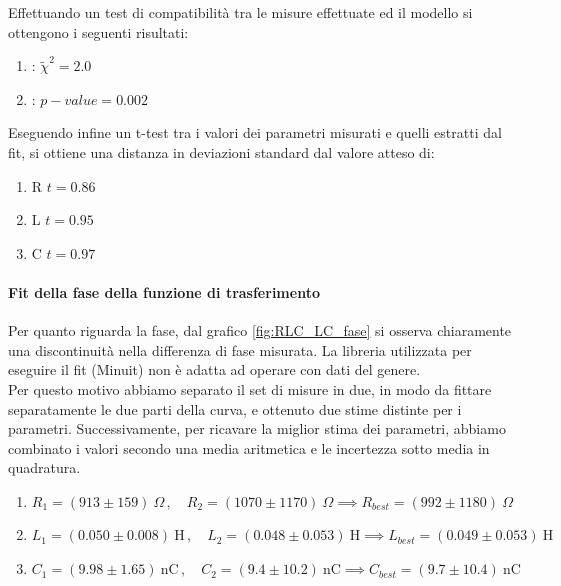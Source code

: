\documentclass[letterpaper,12pt]{article}
\begin{document}
Effettuando un test di compatibilità tra le misure effettuate ed il modello si ottengono i seguenti risultati:

\begin{enumerate} 
    \item: $\widetilde{\chi}^2 = 2.0$   
    \item: $p-value = 0.002$ 
\end{enumerate}

Eseguendo infine un t-test tra i valori dei parametri misurati e quelli estratti dal fit, si ottiene una distanza in deviazioni standard dal valore atteso di:

\begin{enumerate}
    \item R \quad  $t = 0.86$
    \item L \quad $t = 0.95$
    \item C \quad $t = 0.97$
\end{enumerate}

\paragraph{Fit della fase della funzione di trasferimento}
Per quanto riguarda la fase, dal grafico \ref{fig:RLC_LC_fase} si osserva chiaramente una discontinuità nella differenza di fase misurata. La libreria utilizzata per eseguire il fit (Minuit) non è adatta ad operare con dati del genere. \\ %
Per questo motivo abbiamo separato il set di misure in due, in modo da fittare separatamente le due parti della curva, e ottenuto due stime distinte per i parametri. Successivamente, per ricavare la miglior stima dei parametri, abbiamo combinato i valori secondo una media aritmetica e le incertezza sotto media in quadratura.

\begin{enumerate}
    \item $R_1 = (913 \pm 159)\ \Omega \,, \quad R_2 = (1070 \pm 1170)\ \Omega \implies R_{best} = (992 \pm 1180)\ \Omega$
    
    \item $L_1 = (0.050 \pm 0.008)\ \text{H} \,, \quad L_2 = (0.048 \pm 0.053)\ \text{H} \implies L_{best} = (0.049 \pm 0.053)\ \text{H}$

    \item $C_1 = (9.98 \pm 1.65)\ \text{nC} \,, \quad C_2 = (9.4 \pm 10.2)\ \text{nC} \implies C_{best} = (9.7 \pm 10.4)\ \text{nC}$

\end{enumerate}
\end{document}

